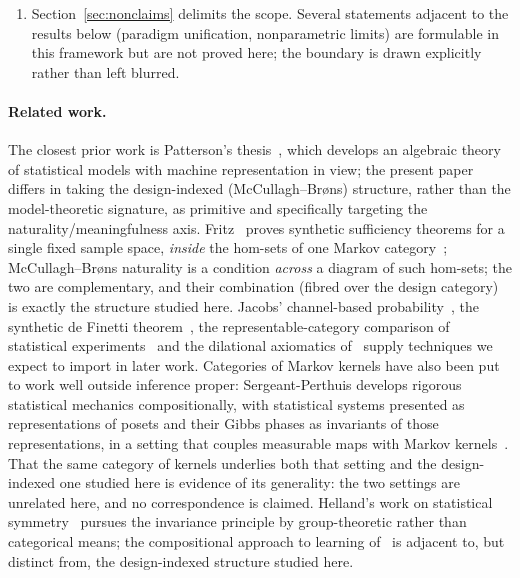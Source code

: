 \documentclass[11pt,a4paper]{article}
\theoremstyle{plain}
\theoremstyle{definition}
\theoremstyle{remark}
\begin{document}
\begin{enumerate}
Gerstenhaber--Schack~\cite{gerstenhaber_schack_1983}/Baues--Wirsching~\cite{baues_cohomology_1985}
is the coboundary of a correction in that class.
The equivalence is proved (Proposition~\ref{wprop:obstruction}),
together with the observation that forces the obstruction to be read relative to
an admissible correction class. The one-way layout is then carried out in full
(Examples~\ref{ex:oneway}--\ref{ex:oneway-h1}).
\item Section~\ref{sec:nonclaims} delimits the scope. Several statements
adjacent to the results below (paradigm unification, nonparametric limits)
are formulable in this framework but are not proved here; the boundary is
drawn explicitly rather than left blurred.
\end{enumerate}

\paragraph{Related work.}
The closest prior work is Patterson's thesis~\cite{patterson_algebra_2020}, which
develops an algebraic theory of statistical models with machine representation
in view; the present paper differs in taking the design-indexed
(McCullagh--Br\o ns) structure, rather than the model-theoretic signature, as
primitive and specifically targeting the naturality/meaningfulness axis.
Fritz~\cite{fritz_synthetic_2020} proves synthetic sufficiency theorems for a single
fixed sample space, \emph{inside} the hom-sets of one Markov
category~\cite[Def.~14.1]{fritz_synthetic_2020}; McCullagh--Br\o ns naturality is a
condition \emph{across} a diagram of such hom-sets; the two are complementary,
and their combination (fibred over the design category) is exactly the
structure studied here. Jacobs' channel-based
probability~\cite{jacobs_structured_2021}, the synthetic de Finetti
theorem~\cite{fritz_definetti_2021}, the representable-category comparison of
statistical experiments~\cite{fritz_representable_2023} and the dilational
axiomatics of~\cite{fritz_dilations_2023} supply techniques we expect to
import in later work. Categories of Markov kernels have also been put to work
well outside inference proper: Sergeant-Perthuis develops rigorous statistical
mechanics compositionally, with statistical systems presented as
representations of posets and their Gibbs phases as invariants of those
representations, in a setting that couples measurable maps with Markov
kernels~\cite{sergeantperthuis_categorical_2023,
sergeantperthuis_compositional_2024}. That the same category of kernels underlies
both that setting and the design-indexed one studied here is evidence of its
generality:
the two settings are unrelated here, and no correspondence is claimed.
Helland's work on
statistical symmetry~\cite{helland_steps_2010} pursues the invariance principle by
group-theoretic rather than categorical means; the compositional approach to
learning of~\cite{fong_backprop_2019} is adjacent to, but distinct from, the
design-indexed structure studied here.
\end{document}
